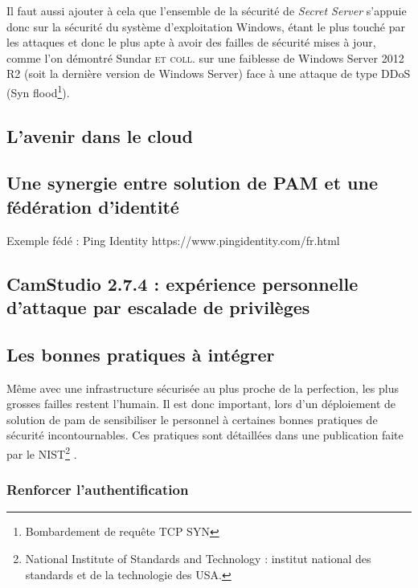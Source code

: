 Il faut aussi ajouter à cela que l'ensemble de la sécurité de \emph{Secret Server} s'appuie donc sur la sécurité du système d'exploitation Windows, étant le plus touché par les attaques et donc le plus apte à avoir des failles de sécurité mises à jour, comme l'on démontré Sundar \textsc{et coll.}\cite{skk} sur une faiblesse de Windows Server 2012 R2 (soit la dernière version de Windows Server) face à une attaque de type DDoS (Syn flood\footnote{Bombardement de requête TCP SYN}).

\subsection{L'avenir dans le cloud}
\label{subsec:avenircloud}

\subsection{Une synergie entre solution de PAM et une fédération d'identité}
\label{subsec:syner}

Exemple fédé : Ping Identity https://www.pingidentity.com/fr.html

\subsection{CamStudio 2.7.4 : expérience personnelle d'attaque par escalade de privilèges}
\label{subsec:camstudio}

\subsection{Les bonnes pratiques à intégrer}
\label{subsec:pratiques}

Même avec une infrastructure sécurisée au plus proche de la perfection, les plus grosses failles restent l'humain. Il est donc important, lors d'un déploiement de solution de \gls{pam} de sensibiliser le personnel à certaines bonnes pratiques de sécurité incontournables. Ces pratiques sont détaillées dans une publication faite par le \textsc{NIST}\footnote{National Institute of Standards and Technology : institut national des standards et de la technologie des USA.} \cite{nist}.

\subsubsection{Renforcer l'authentification}
\label{par:auth}

